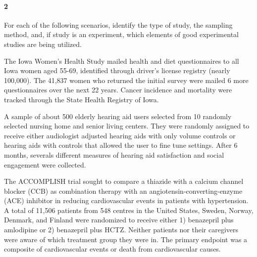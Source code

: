 \documentclass{article}
\begin{document}
\begin{flushleft}
\newpage
\paragraph{2} For each of the following scenarios, identify the type of study, the sampling method, and, if study is an experiment, which elements of good experimental studies are being utilized.

\begin{enumalpha}
\item The Iowa Women's Health Study mailed health and diet questionnaires to all Iowa women aged 55-69, identified through driver's license registry (nearly 100,000). The 41,837 women who returned the initial survey were mailed 6 more questionnaires over the next 22 years. Cancer incidence and mortality were tracked through the State Health Registry of Iowa.\\ \medskip
{}
\vspace{0.5in}

\item A sample of about 500 elderly hearing aid users selected from 10 randomly selected nursing home and senior living centers. They were randomly assigned to receive either audiologist adjusted hearing aids with only volume controls or hearing aids with controls that allowed the user to fine tune settings. After 6 months, severals different measures of hearing aid satisfaction and social engagement were collected.\\ \medskip
{}
\vspace{0.5in}

\item The ACCOMPLISH trial sought to compare a thiazide with a calcium channel blocker (CCB) as combination therapy with an angiotensin-converting-enzyme (ACE) inhibitor in reducing cardiovascular events in patients with hypertension. A total of 11,506 patients from 548 centres in the United States, Sweden, Norway, Denmark, and Finland were randomized to receive either 1) benazepril plus amlodipine or 2) benazepril plus HCTZ. Neither patients nor their caregivers were aware of which treatment group they were in. The primary endpoint was a composite of cardiovascular events or death from cardiovascular causes. \\ \medskip
{}
\vspace{0.5in}


\end{enumalpha}
\end{flushleft}
\end{document}
